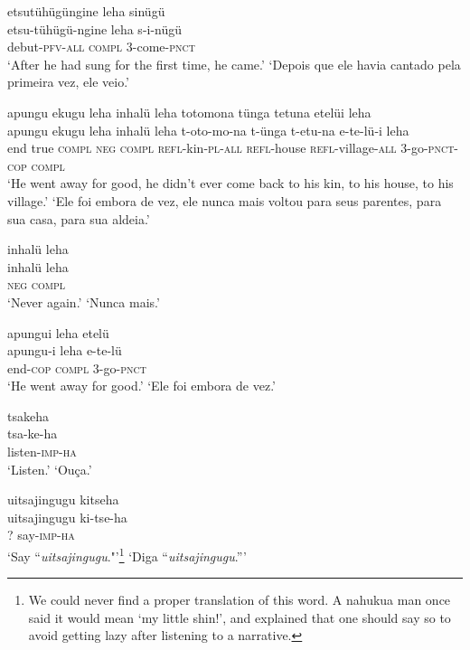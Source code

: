 \documentclass[output=paper,
modfonts,nonflat
]{langsci/langscibook}
\begin{document}
\newpage 
\ea  etsutühügüngine leha sinügü\\[.3em]
\gll etsu-tühügü-ngine leha s-i-nügü\\
     debut-\textsc{pfv}-\textsc{all} \textsc{compl} 3-come-\textsc{pnct}\\
\glt ‘After he had sung for the first time, he came.’
\glt ‘Depois que ele havia cantado pela primeira vez, ele veio.’
\z

\ea  apungu ekugu leha inhalü leha totomona tünga tetuna etelüi leha\\[.3em]
\gll apungu ekugu leha inhalü leha t-oto-mo-na t-ünga t-etu-na e-te-lü-i leha\\
     end true \textsc{compl} \textsc{neg} \textsc{compl} \textsc{refl}-kin-\textsc{pl}-\textsc{all} \textsc{refl}-house \textsc{refl}-village-\textsc{all} 3-go-\textsc{pnct}-\textsc{cop} \textsc{compl}\\
\glt ‘He went away for good, he didn't ever come back to his kin, to his house, to his village.’
\glt ‘Ele foi embora de vez, ele nunca mais voltou para seus parentes, para sua casa, para sua aldeia.’
\z

\ea  inhalü leha\\[.3em]
\gll inhalü leha\\
     \textsc{neg} \textsc{compl}\\
\glt ‘Never again.’
\glt ‘Nunca mais.’
\z

\ea  apungui leha etelü\\[.3em]
\gll apungu-i leha e-te-lü\\
     end-\textsc{cop} \textsc{compl} 3-go-\textsc{pnct}\\
\glt ‘He went away for good.’
\glt ‘Ele foi embora de vez.’
\z

\ea  tsakeha\\[.3em]
\gll tsa-ke-ha\\
     listen-\textsc{imp}-\textsc{ha}\\
\glt ‘Listen.’
\glt ‘Ouça.’
\z

\newpage
\ea  uitsajingugu kitseha\\[.3em]
\gll uitsajingugu ki-tse-ha\\
     ? say-\textsc{imp}-\textsc{ha}\\
\glt ‘Say “\textit{uitsajingugu}."’\footnote{We could never find a proper translation of this word. A nahukua man once said it would mean `my little shin!', and explained that one should say so to avoid getting lazy after listening to a narrative.}
\glt ‘Diga “\textit{uitsajingugu}.''{}’
\z
\end{document}
